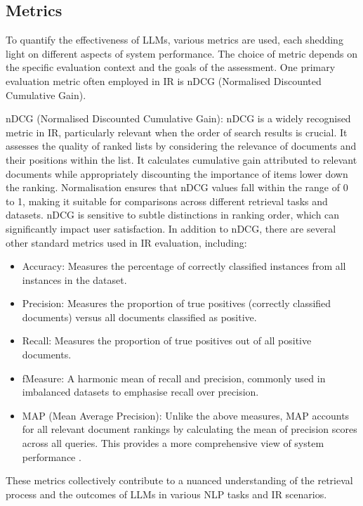 \subsection{Metrics}
To quantify the effectiveness of LLMs, various metrics are used, each shedding light on different aspects of system performance. The choice of metric depends on the specific evaluation context and the goals of the assessment. One primary evaluation metric often employed in IR is nDCG (Normalised Discounted Cumulative Gain).

nDCG (Normalised Discounted Cumulative Gain): nDCG is a widely recognised metric in IR, particularly relevant when the order of search results is crucial. It assesses the quality of ranked lists by considering the relevance of documents and their positions within the list. It calculates cumulative gain attributed to relevant documents while appropriately discounting the importance of items lower down the ranking. Normalisation ensures that nDCG values fall within the range of 0 to 1, making it suitable for comparisons across different retrieval tasks and datasets. nDCG is sensitive to subtle distinctions in ranking order, which can significantly impact user satisfaction.
In addition to nDCG, there are several other standard metrics used in IR evaluation, including:

\begin{itemize}
    \item Accuracy: Measures the percentage of correctly classified instances from all instances in the dataset.
    \item Precision: Measures the proportion of true positives (correctly classified documents) versus all documents classified as positive.
    \item Recall: Measures the proportion of true positives out of all positive documents.
    \item fMeasure: A harmonic mean of recall and precision, commonly used in imbalanced datasets to emphasise recall over precision.
    \item MAP (Mean Average Precision): Unlike the above measures, MAP accounts for all relevant document rankings by calculating the mean of precision scores across all queries. This provides a more comprehensive view of system performance \cite{sokolova}.
\end{itemize}

These metrics collectively contribute to a nuanced understanding of the retrieval process and the outcomes of LLMs in various NLP tasks and IR scenarios.